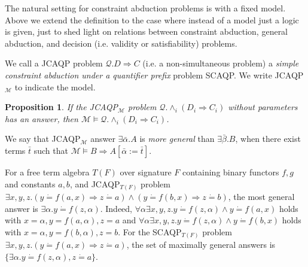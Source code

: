 \documentclass{article}
\newcommand{\assign}{:=}
\newcommand{\tmem}[1]{{\em #1\/}}
\newcommand{\tmrsub}[1]{\ensuremath{_{\textrm{#1}}}}
\newtheorem{proposition}{Proposition}
\begin{document}
The natural setting for constraint abduction problems is with a fixed model.
Above we extend the definition to the case where instead of a model just a
logic is given, just to shed light on relations between constraint abduction,
general abduction, and decision (i.e. validity or satisfiability) problems.

We call a JCAQP problem $\mathcal{Q}.D \Rightarrow C$ (i.e. a non-simultaneous
problem) a {\tmem{simple constraint abduction under a quantifier prefix}}
problem SCAQP. We write JCAQP$_{\mathcal{M}}$ to indicate the model.

\begin{proposition}
  If the JCAQP\tmrsub{$\mathcal{M}$} problem $\mathcal{Q}. \wedge_i (D_i
  \Rightarrow C_i)$ without parameters has an answer, then $\mathcal{M} \vDash
  \mathcal{Q}. \wedge_i (D_i \Rightarrow C_i)$.
\end{proposition}

We say that JCAQP\tmrsub{$\mathcal{M}$} answer $\exists \bar{\alpha} .A$ is
{\tmem{more general}} than $\exists \bar{\beta} .B$, when there exist terms
$\bar{t}$ such that $\mathcal{M} \vDash B \Rightarrow A [\bar{\alpha} \assign
\bar{t}]$.

\begin{example}
  For a free term algebra $T (F)$ over signature $F$ containing binary
  functors $f, g$ and constants $a, b$, and JCAQP\tmrsub{$T (F)$} problem $_{}
  \exists x, y, z. (y \dot{=} f (a, x) \Rightarrow z \dot{=} a) \wedge (y
  \dot{=} f (b, x) \Rightarrow z \dot{=} b)$, the most general answer is
  $\exists \alpha .y \dot{=} f (z, \alpha)$. Indeed, $\forall \alpha \exists
  x, y, z.y \dot{=} f (z, \alpha) \wedge y \dot{=} f (a, x)$ holds with $x =
  \alpha, y = f (a, \alpha), z = a$ and $\forall \alpha \exists x, y, z.y
  \dot{=} f (z, \alpha) \wedge y \dot{=} f (b, x)$ holds with $x = \alpha, y =
  f (b, \alpha), z = b$. For the SCAQP\tmrsub{$T (F)$} problem $_{} \exists x,
  y, z. (y \dot{=} f (a, x) \Rightarrow z \dot{=} a)$, the set of maximally
  general answers is $\{\exists \alpha .y \dot{=} f (z, \alpha), z \dot{=}
  a\}$.
\end{example}
\end{document}
